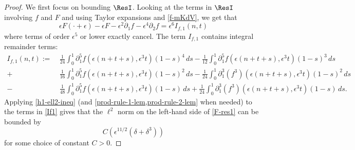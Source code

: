 \documentclass[oneside,reqno]{amsart}
\begin{document}
\begin{proof}
	We first focus on bounding \(\ResI\). Looking at the terms in \(\ResI\) involving \(f\) and \(F\) and using Taylor expansions and \cref{f-mKdV}, we get that
	\begin{equation}\label{F-res1}
			\epsilon F(\cdot + \epsilon) - \epsilon F - \epsilon^2 \partial_1 f - \epsilon^4 \partial_2 f = \epsilon^6 I_{f,1}(n,t)
	\end{equation}
	where terms of order \(\epsilon^5\) or lower exactly cancel. The term \(I_{f,1}\) contains integral remainder terms:
	\begin{equation}\label{If1}
		\begin{aligned}
			I_{f,1}(n,t) := \ &\frac{1} {24} \int_0^1 \partial_1^5 f(\epsilon(n+t+s), \epsilon^3 t)(1-s)^4\, ds - \frac{1} {12} \int_0^1 \partial_1^5 f(\epsilon(n+t+s), \epsilon^3 t)(1-s)^3\, ds \\
			+ & \frac{1} {16} \int_0^1 \partial_1^5 f(\epsilon(n+t+s), \epsilon^3 t)(1-s)^2\, ds -  \frac{1} {24} \int_0^1 \partial_1^3 (f^3)(\epsilon(n+t+s), \epsilon^3 t)(1-s)^2\, ds \\
			- & \frac{1}{48} \int_0^1 \partial_1^5f(\epsilon(n+t+s), \epsilon^3 t)(1-s)\, ds +  \frac{1}{24} \int_0^1 \partial_1^3 (f^3)(\epsilon(n+t+s), \epsilon^3 t) (1-s)\, ds.
		\end{aligned}
	\end{equation}
	Applying \cref{h1-ell2-ineq} (and \cref{prod-rule-1-lem,prod-rule-2-lem} when needed) to the terms in \cref{If1} gives that the \(\ell^2\) norm on the left-hand side of \cref{F-res1} can be bounded by \[C(\epsilon^{11/2}(\delta + \delta^3))\] for some choice of constant \(C>0\).
	

\end{proof}
\end{document}
